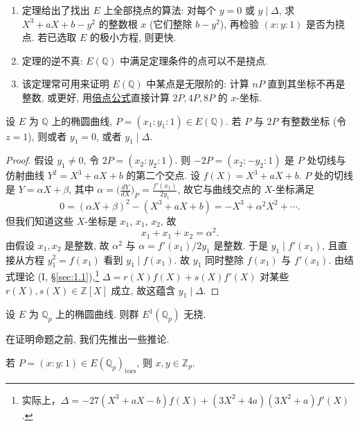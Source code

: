 \begin{remark} \label{thm:2.5.2} 
\begin{enumerate}[label=\textup{(\alph*)}]
\item 定理给出了找出 $E$ 上全部挠点的算法: 对每个 $y = 0$ 或 $y\mid\Delta$, 求 $X^3 + aX + b - y^2$ 的整数根 $x$ (它们整除 $b - y^2$), 再检验 $(x:y:1)$ 是否为挠点. 若已选取 $E$ 的极小方程, 则更快.
\item 定理的逆不真: $E(\mathbb{Q})$ 中满足定理条件的点可以不是挠点.
\item 该定理常可用来证明 $E(\mathbb{Q})$ 中某点是无限阶的: 计算 $nP$ 直到其坐标不再是整数, 或更好, 用\hyperref[eq:dup]{倍点公式}直接计算 $2P, 4P, 8P$ 的 $x$-坐标.
\end{enumerate}
\end{remark}

\begin{proposition} \label{thm:2.5.3} 
设 $E$ 为 $\mathbb{Q}$ 上的椭圆曲线, $P = (x_1:y_1:1)\in E(\mathbb{Q})$. 若 $P$ 与 $2P$ 有整数坐标 (令 $z = 1$), 则或者 $y_1 = 0$, 或者 $y_1\mid\Delta$.
\end{proposition}

\begin{proof}
假设 $y_1\neq 0$, 令 $2P = (x_2:y_2:1)$. 则 $-2P = (x_2:-y_2:1)$ 是 $P$ 处切线与仿射曲线 $Y^2 = X^3 + aX + b$ 的第二个交点. 设 $f(X) = X^3 + aX + b$. $P$ 处的切线是 $Y = \alpha X + \beta$, 其中 $\alpha = \bigl(\frac{dY}{dX}\bigr)_P = \frac{f'(x_1)}{2y_1}$, 故它与曲线交点的 $X$-坐标满足
\[
0 = (\alpha X + \beta)^2 - (X^3 + aX + b) = -X^3 + \alpha^2X^2 + \cdots.
\]
但我们知道这些 $X$-坐标是 $x_1$, $x_1$, $x_2$, 故
\[
x_1 + x_1 + x_2 = \alpha^2.
\]
由假设 $x_1, x_2$ 是整数, 故 $\alpha^2$ 与 $\alpha = f'(x_1)/2y_1$ 是整数. 于是 $y_1\mid f'(x_1)$, 且直接从方程 $y_1^2 = f(x_1)$ 看到 $y_1\mid f(x_1)$. 故 $y_1$ 同时整除 $f(x_1)$ 与 $f'(x_1)$. 由结式理论 (I, \S\ref{sec:1.1}),\footnote{实际上，$\Delta=-27(X^3+aX-b)f(X)+(3X^2+4a)(3X^2+a)f'(X)$.} $\Delta = r(X)f(X) + s(X)f'(X)$ 对某些 $r(X), s(X)\in\mathbb{Z}[X]$ 成立, 故这蕴含 $y_1\mid\Delta$.
\end{proof}

\begin{proposition} \label{thm:2.5.4} 
设 $E$ 为 $\mathbb{Q}_p$ 上的椭圆曲线. 则群 $E^1(\mathbb{Q}_p)$ 无挠.
\end{proposition}

在证明命题之前, 我们先推出一些推论.

\begin{corollary} \label{thm:2.5.5} 
若 $P = (x:y:1)\in E(\mathbb{Q}_p)_{\mathrm{tors}}$, 则 $x, y\in\mathbb{Z}_p$.
\end{corollary}

